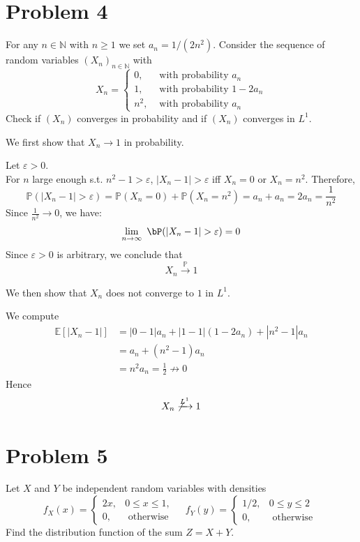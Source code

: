 \section*{Problem 4}
For any $n \in \mathbb{N}$ with $n \geq 1$ we set $a_n=1 /\left(2 n^2\right)$. 
Consider the sequence of random variables $\left(X_n\right)_{n \in \mathbb{N}}$ with
$$
X_n= 
\begin{cases}
0, & \text { with probability } a_n \\ 
1, & \text { with probability } 1-2 a_n \\ 
n^2, & \text { with probability } a_n
\end{cases}
$$
Check if $\left(X_n\right)$ converges in probability and 
if $\left(X_n\right)$ converges in $L^1$.
\begin{solution}

We first show that $X_n \to 1$ in probability.

Let $\varepsilon>0$.\\
For $n$ large enough s.t. $n^2-1>\varepsilon$,
$|X_n-1|>\varepsilon$ iff $X_n=0$ or $X_n=n^2$. Therefore,
\[
\mathbb{P}(|X_n-1|>\varepsilon)
=\mathbb{P}(X_n=0)+\mathbb{P}(X_n=n^2)
=a_n+a_n
=2a_n
=\frac{1}{n^2}
\]
Since
\(
\frac{1}{n^2}\to 0
\), we have: 
\[
\lim_{n\to\infty} \
\bP(|X_n -1| > \varepsilon) = 0
\]
Since $\varepsilon>0$ is arbitrary, we conclude that
$$
X_n \xrightarrow{\mathbb{P}} 1
$$

We then show that $X_n$ does not converge to $1$ in $L^1$.

We compute
\begin{align*}
\mathbb{E}[|X_n-1|]
&=|0-1| a_n + |1-1| (1-2a_n) + |n^2-1|  a_n\\
&=a_n + (n^2-1)a_n\\
&= n^2 a_n = \frac{1}{2} \not\to 0
\end{align*}
Hence
\[
X_n \not\xrightarrow{L^1} 1
\]
\end{solution}

\section*{Problem 5}
Let $X$ and $Y$ be independent random variables with densities
$$
f_X(x)=\left\{
\begin{array}{ll}
2 x, & 0 \leq x \leq 1, \\
0, & \text { otherwise }
\end{array} \quad f_Y(y)= 
\begin{cases}1 / 2, & 0 \leq y \leq 2 \\
0, & \text { otherwise }
\end{cases}\right.
$$
Find the distribution function of the sum $Z=X+Y$.

